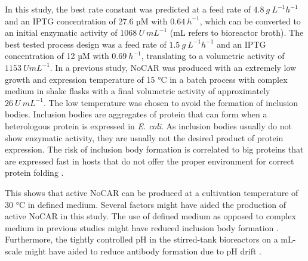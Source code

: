 \documentclass[sn-standardnature]{sn-jnl}%
\theoremstyle{thmstyleone}%
\theoremstyle{thmstyletwo}%
\theoremstyle{thmstylethree}%
\begin{document}
In this study, the best rate constant was predicted at a feed rate of $4.8\ g\ L^{-1} h^{-1}$ and an IPTG concentration of 27.6 µM with $0.64\ h^{-1}$, which can be converted to an initial enzymatic activity of $1068\ U\ mL^{-1}$ (mL refers to bioreactor broth).
The best tested process design was a feed rate of $1.5\ g\ L^{-1} h^{-1}$ and an IPTG concentration of 12 µM with $0.69\ h^{-1}$, translating to a volumetric activity of $1153\ UmL^{-1}$.
In a previous study, NoCAR was produced with an extremely low growth and expression temperature of 15 °C in a batch process with complex medium in shake flasks with a final volumetric activity of approximately $26\ U\ mL^{-1}$\cite{weber2021production}.
The low temperature was chosen to avoid the formation of inclusion bodies. Inclusion bodies are aggregates of protein that can form when a heterologous protein is expressed in \textit{E. coli}. As inclusion bodies usually do not show enzymatic activity, they are usually not the desired product of protein expression.
The risk of inclusion body formation is correlated to big proteins that are expressed fast in hosts that do not offer the proper environment for correct protein folding \cite{bhatwa2021challenges,neubauer2001expression,fahnert2004inclusion}.

This shows that active NoCAR can be produced at a cultivation temperature of 30 °C in defined medium. Several factors might have aided the production of active NoCAR in this study.
The use of defined medium as opposed to complex medium in previous studies might have reduced inclusion body formation \cite{neubauer2001expression,fahnert2004inclusion}.
Furthermore, the tightly controlled pH in the stirred-tank bioreactors on a mL-scale might have aided to reduce antibody formation due to pH drift \cite{strandberg1991factors}.
\end{document}
